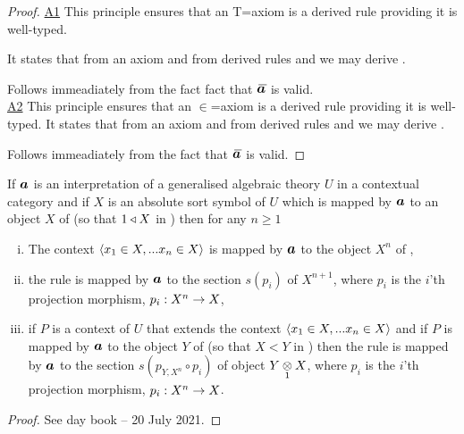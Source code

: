 \begin{proof}
\underline{A1} 
This principle ensures that an T=axiom is a derived rule providing it is well-typed.
 
It states that from an axiom  and from derived rules
 \ZDelta and \ZDeltap we may derive
.

\vspace{1cm}
Follows immeadiately from the fact fact that $\Ibar$ is  valid.\\

\underline{A2} 
This principle ensures that an $\in$=axiom is a derived rule providing it is well-typed.
It states that from an axiom  and from derived rules
 \ZtDelta and \ZtpDelta we may derive
.

Follows immeadiately from the fact that $\Ibar$ is  valid. 
\end{proof}

\begin{lemma}
If $\iI$ is an interpretation of a generalised algebraic theory $U$ in a contextual category \catcw and if $X$ is an absolute sort symbol of $U$ which is mapped 
by $\iI$ to an object $X$ of \catcw (so that $1 \base X$ in \catc) then for any $n \geq 1$ 
\begin{enumerate}[(i)]
\item
The context $\tuple{\ofT{x_1}{X},...\ofT{x_n}{X}}$ is mapped by $\iI$ to the object $X^n$ of \catc,
\item the rule 
 is mapped by $\iI$ to the section $s(p_i)$ of $X^{n+1}$, where $p_i$ is the $i$'th projection morphism, $p_i: X^n \morph X$,
\item if $P$ is a context of $U$ that extends the context $\tuple{\ofT{x_1}{X},...\ofT{x_n}{X}}$ and if $P$ is mapped by $\iI$ to
the object $Y$ of \catcw (so that $X < Y$ in \catc) then the rule 
 is mapped by $\iI$ to the section $s(p_{Y,X^n}\circ p_i)$ of object $\crossx{Y}{X}{1}$, where $p_i$ is the $i$'th projection morphism, $p_i: X^n \morph X$.
\end{enumerate}
\end{lemma}
\begin{proof}
See day book -- 20 July 2021.
\end{proof}

